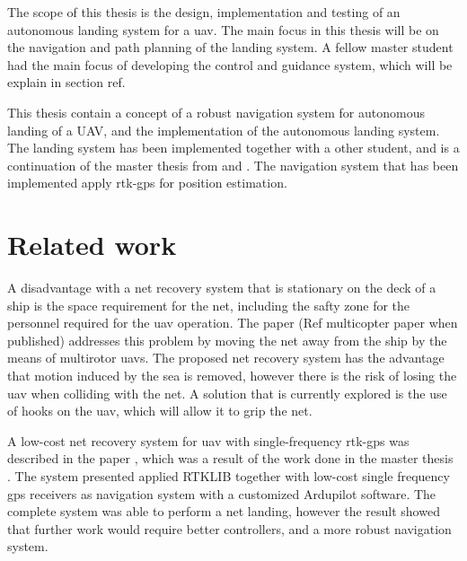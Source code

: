 The scope of this thesis is the design, implementation and testing of an autonomous landing system for a uav. The main focus in this thesis will be on the navigation and path planning of the landing system. A fellow master student had the main focus of developing the control and guidance system, which will be explain in section ref.


This thesis contain a concept of a robust navigation system for autonomous landing of a UAV, and the implementation of the autonomous landing system. The landing system has been implemented together with a other student, and is a continuation of the master thesis from \citep{Froelich} and \citep{Skulstad&Syversen}. The navigation system that has been implemented apply rtk-gps for position estimation.
\section{Related work}
A disadvantage with a net recovery system that is stationary on the deck of a ship is the space requirement for the net, including the safty zone for the personnel required for the uav operation. The paper (Ref multicopter paper when published) addresses this problem by moving the net away from the ship by the means of multirotor uavs. The proposed net recovery system has the advantage that motion induced by the sea is removed, however there is the risk of losing the uav when colliding with the net. A solution that is currently explored is the use of hooks on the uav, which will allow it to grip the net.

A low-cost net recovery system for \gls{uav} with single-frequency \gls{rtk-gps} was described in the paper \citep{skulstad2015net}, which was a result of the work done in the master thesis \citep{Skulstad&Syversen}. The system presented applied RTKLIB together with low-cost single frequency \gls{gps} receivers as navigation system with a customized Ardupilot software. The complete system was able to perform a net landing, however the result showed that further work would require better controllers, and a more robust navigation system.


